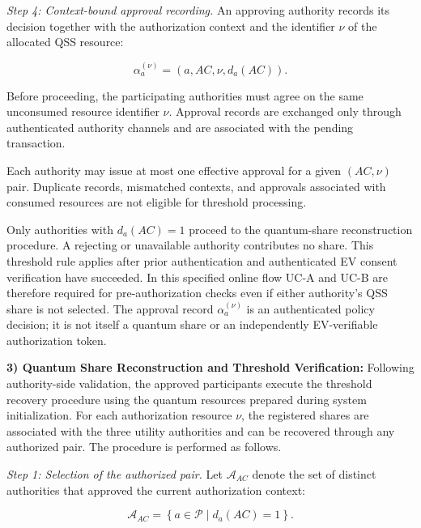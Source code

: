 \documentclass[twocolumn,10pt,journal]{IEEEtran}
\begin{document}
\textit{Step 4: Context-bound approval recording.}
An approving authority records its decision
together with the authorization context and
the identifier $\nu$ of the allocated QSS
resource:

\begin{equation}
\alpha_a^{(\nu)}
=
(a,AC,\nu,d_a(AC)).
\label{eq:qsv2g_authority_approval}
\end{equation}

Before proceeding, the participating authorities
must agree on the same unconsumed resource
identifier $\nu$. Approval records are exchanged
only through authenticated authority channels
and are associated with the pending transaction.

Each authority may issue at most one effective
approval for a given $(AC,\nu)$ pair. Duplicate
records, mismatched contexts, and approvals
associated with consumed resources are not
eligible for threshold processing.

Only authorities with $d_a(AC)=1$ proceed
to the quantum-share reconstruction procedure.
A rejecting or unavailable authority contributes
no share. This threshold rule applies after prior authentication
and authenticated EV consent verification have succeeded. In this
specified online flow UC-A and UC-B are therefore required for
pre-authorization checks even if either authority's QSS share is
not selected. The approval record $\alpha_a^{(\nu)}$
is an authenticated policy decision; it is not
itself a quantum share or an independently
EV-verifiable authorization token.

\noindent\textbf{3) Quantum Share Reconstruction and
Threshold Verification:}
Following authority-side validation, the approved
participants execute the threshold recovery procedure
using the quantum resources prepared during system
initialization. For each authorization resource $\nu$,
the registered shares are associated with the three
utility authorities and can be recovered through any
authorized pair. The procedure is performed as follows.

\textit{Step 1: Selection of the authorized pair.}
Let $\mathcal{A}_{AC}$ denote the set of distinct
authorities that approved the current authorization
context:

\begin{equation}
\mathcal{A}_{AC}
=
\left\{
a\in\mathcal{P}
\mid d_a(AC)=1
\right\}.
\label{eq:qsv2g_approved_set}
\end{equation}
\end{document}
